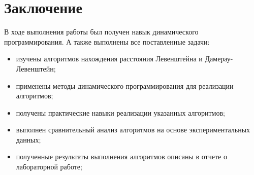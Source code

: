 \chapter*{Заключение}

В ходе выполнения работы был получен навык динамического программирования. А также выполнены все поставленные задачи:

\begin{itemize}
	\item изучены алгоритмов нахождения расстояния Левенштейна и Дамерау-Левенштейн;
	\item применены методы динамического программирования для реализации алгоритмов;
	\item получены практические навыки реализации указанных алгоритмов;
	\item выполнен сравнительный анализ алгоритмов на основе экспериментальных данных;
	\item полученные результаты выполнения алгоритмов описаны в отчете о лабораторной работе;
\end{itemize}
